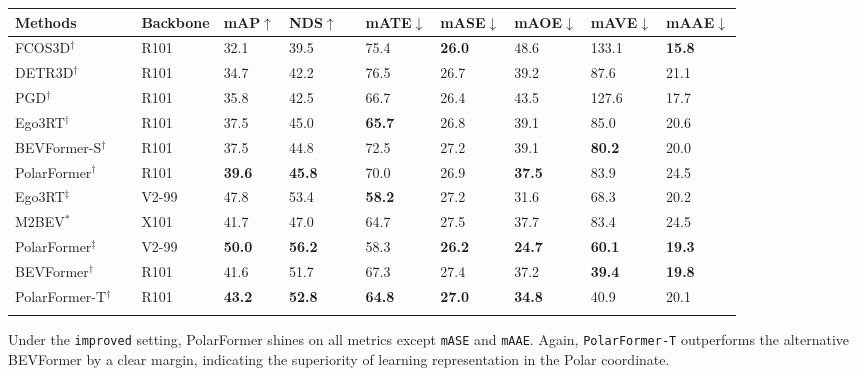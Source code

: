 \documentclass[letterpaper]{article} \usepackage{aaai23}  \usepackage{times}  \usepackage{helvet}  \usepackage{courier}  \usepackage[hyphens]{url}  \usepackage{graphicx} \urlstyle{rm} \def\UrlFont{\rm}  \usepackage{natbib}  \usepackage{caption} \frenchspacing  \setlength{\pdfpagewidth}{8.5in} \setlength{\pdfpageheight}{11in} \usepackage{algorithm}
\begin{document}
\begin{table*}[t]
\begin{tabular}{lC{0.0cm}C{1cm}C{1.2cm}C{0.5cm}C{0.15cm}C{0.75cm}C{0.75cm}C{0.75cm}C{0.75cm}C{0.75cm}}
    \hline
    \textbf{Methods} &   & \textbf{Backbone} & \textbf{mAP}$\uparrow$  &\textbf{NDS}$\uparrow$  &   &\textbf{mATE}$\downarrow$   &\textbf{mASE}$\downarrow$   &\textbf{mAOE}$\downarrow$   &\textbf{mAVE}$\downarrow$   &\textbf{mAAE}$\downarrow$  \\
    \hline
    FCOS3D$^{\dag}$~\cite{wang2021fcos3d} & & R101 & 32.1 &  39.5 & & 75.4 & \textbf{26.0} & 48.6 & 133.1 & \textbf{15.8} \\
    DETR3D$^{\dag}$~\cite{wang2022detr3d} & & R101 & 34.7 & 42.2 & & 76.5 & 26.7 & 39.2 & 87.6 & 21.1\\
    PGD$^{\dag}$~\cite{wang2022probabilistic} & & R101& 35.8  & 42.5 & & 66.7 & 26.4 & 43.5 & 127.6 & 17.7\\
    Ego3RT$^{\dag}$~\cite{lu2022ego3rt} & & R101 &  37.5 & 45.0 & & \textbf{65.7} & 26.8 & 39.1 & 85.0 & 20.6 \\ 
    BEVFormer-S$^{\dag}$~\cite{li2022bevformer} & & R101 & 37.5 & 44.8 & & 72.5 & 27.2 & 39.1 & \textbf{80.2} & 20.0\\
    PolarFormer$^{\dag}$ & & R101 & \textbf{39.6} & \textbf{45.8} & & 70.0 & 26.9 & \textbf{37.5} & 83.9 & 24.5\\
    \cmidrule(lr){1-11}
    Ego3RT$^{\ddag}$~\cite{lu2022ego3rt} & & V2-99 &  47.8 & 53.4 & & \textbf{58.2} & 27.2 & 31.6 & 68.3 & 20.2 \\ 
    M2BEV$^{*}$~\cite{xie2022m} & & X101 &  41.7 & 47.0  & & 64.7 & 27.5 & 37.7 & 83.4 & 24.5 \\
    PolarFormer$^{\ddag}$ & & V2-99 & \textbf{50.0}  & \textbf{56.2} & & 58.3 & \textbf{26.2} & \textbf{24.7} & \textbf{60.1} & \textbf{19.3} \\
    \cmidrule(lr){1-11}
     BEVFormer$^{\dag}$~\cite{li2022bevformer} & & R101 & 41.6 & 51.7 & & 67.3 & 27.4 & 37.2 & \textbf{39.4} & \textbf{19.8} \\
 
     PolarFormer-T$^{\dag}$ & & R101 & \textbf{43.2} & \textbf{52.8} & & \textbf{64.8} & \textbf{27.0} & \textbf{34.8} & 40.9 & 20.1 \\
    \hline
    
    \hline
    \end{tabular}
  \label{tab:nus-det-val}
\end{table*}%
Under the \texttt{improved} setting, PolarFormer shines on all metrics except \texttt{mASE} and \texttt{mAAE}.
Again, \texttt{PolarFormer-T} outperforms the alternative BEVFormer by a clear margin,
indicating the superiority of learning representation in the Polar coordinate. 
\end{document}
